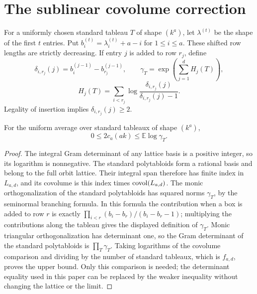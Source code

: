 \section{The sublinear covolume correction}

For a uniformly chosen standard tableau $T$ of shape $(k^a)$, let
$\lambda^{(t)}$ be the shape of the first $t$ entries. Put
$b_i^{(t)}=\lambda_i^{(t)}+a-i$ for $1\le i\le a$. These shifted row
lengths are strictly decreasing. If entry $j$ is added to row $r_j$,
define
\[
 \delta_{i,r_j}(j)=b_i^{(j-1)}-b_{r_j}^{(j-1)},
 \qquad \gamma_T=\exp\!\left(\sum_{j=1}^d H_j(T)\right),
\]
\[
 H_j(T)=\sum_{i<r_j}\log\frac{\delta_{i,r_j}(j)}{\delta_{i,r_j}(j)-1}.
\]
Legality of insertion implies $\delta_{i,r_j}(j)\ge2$.

\begin{lemma}
\label{lem:specht-gram-bound}
\leanok
For the uniform average over standard tableaux of shape $(k^a)$,
\[
 0\le 2c_a(ak)\le\mathbb E\log\gamma_T.
\]
\end{lemma}
\begin{proof}
The integral Gram determinant of any lattice basis is a positive integer,
so its logarithm is nonnegative. The standard polytabloids form a rational
basis and belong to the full orbit lattice. Their integral span therefore
has finite index in $L_{a,d}$, and its covolume is this index times
$\operatorname{covol}(L_{a,d})$.
The monic orthogonalization of the standard polytabloids has squared
norms $\gamma_T$, by the seminormal branching formula. In this formula
the contribution when a box is added to row $r$ is exactly
$\prod_{i<r}(b_i-b_r)/(b_i-b_r-1)$; multiplying the contributions along
the tableau gives the displayed definition of $\gamma_T$.
Monic triangular orthogonalization has determinant one, so the Gram
determinant of the standard polytabloids is $\prod_T\gamma_T$.
Taking logarithms of the covolume comparison and dividing by the number
of standard tableaux, which is $f_{a,d}$, proves the upper bound.
Only this comparison is needed; the determinant equality used in this
paper can be replaced by the weaker inequality without changing the
lattice or the limit.
\end{proof}

